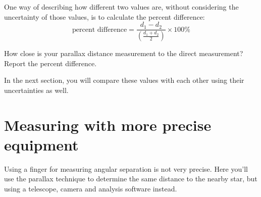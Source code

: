 One way of describing how different two values are, without considering the uncertainty of those values, is to calculate the percent difference:
\begin{equation}
\textrm{percent difference} = \frac{d_1 - d_2}{\left(\frac{d_1+d_2}{2}\right)} \times 100\%
\end{equation}

\begin{steps}	
	\item How close is your parallax distance measurement to the direct measurement? Report the percent difference.
\end{steps}

In the next section, you will compare these values with each other using their uncertainties as well.


\section{Measuring with more precise equipment}

Using a finger for measuring angular separation is not very precise. Here you'll use the parallax technique to determine the same distance to the nearby star, but using a telescope, camera and analysis software instead.

